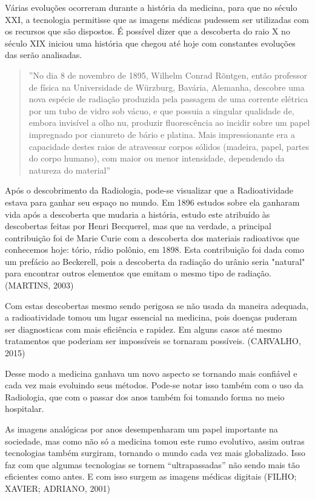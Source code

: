 \documentclass[
	12pt,				%
	openright,			%
	twoside,			%
	a4paper,			%
	english,			%
	french,				%
	spanish,			%
	brazil				%
	]{abntex2}
\begin{document}
Várias evoluções ocorreram durante a história da medicina, para que no século XXI, a tecnologia permitisse que as imagens médicas pudessem ser utilizadas com os recursos que são dispostos. É possível dizer que a descoberta do raio X no século XIX iniciou uma história que chegou até hoje com constantes evoluções das serão analisadas. 

\begin{quote}
''No dia 8 de novembro de 1895, Wilhelm Conrad Rõntgen, então professor de física na Universidade de Würzburg, Bavária, Alemanha, descobre uma nova espécie de radiação produzida pela passagem de uma corrente elétrica por um tubo de vidro sob vácuo, e que possuia a singular qualidade de, embora invisível a olho nu, produzir fluorescência ao incidir sobre um papel impregnado por cianureto de bário e platina. Mais impressionante era a capacidade destes raios de atravessar corpos sólidos (madeira, papel, partes do corpo humano), com maior ou menor intensidade, dependendo da natureza do material''%
\end{quote}

Após o descobrimento da Radiologia, pode-se visualizar que a Radioatividade estava para ganhar seu espaço no mundo. Em 1896 estudos sobre ela ganharam vida após a descoberta que mudaria a história, estudo este atribuído às descobertas feitas por Henri Becquerel, mas que na verdade, a principal contribuição foi de Marie Curie com a descoberta dos materiais radioativos que conhecemos hoje: tório, rádio polônio, em 1898. Esta contribuição foi dada como um prefácio ao Beckerell, pois a descoberta da radiação do urânio seria "natural" para encontrar outros elementos que emitam o mesmo tipo de radiação. (MARTINS, 2003)


Com estas descobertas mesmo sendo perigosa se não usada da maneira adequada, a radioatividade tomou um lugar essencial na medicina, pois doenças puderam ser diagnosticas com mais eficiência e rapidez. Em alguns casos até mesmo tratamentos que poderiam ser impossíveis se tornaram possíveis. (CARVALHO, 2015)

Desse modo a medicina ganhava um novo aspecto se tornando mais confiável e cada vez mais evoluindo seus métodos. Pode-se notar isso também com o uso da Radiologia, que com o passar dos anos também foi tomando forma no meio hospitalar.

As imagens analógicas por anos desempenharam um papel importante na sociedade, mas como não só a medicina tomou este rumo evolutivo, assim outras tecnologias também surgiram, tornando o mundo cada vez mais globalizado. Isso faz com que algumas tecnologias se tornem “ultrapassadas” não sendo mais tão eficientes como antes. E com isso surgem as imagens médicas digitais (FILHO; XAVIER; ADRIANO, 2001)
\end{document}
